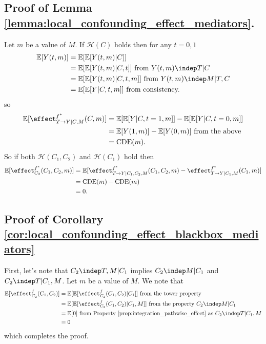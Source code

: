 \subsection{Proof of Lemma \ref{lemma:local_confounding_effect_mediators}.}
\label{proof:local_confounding_effect_mediators}
Let $m$ be a value of $M$. If $\mathcal{H}(C)$ holds then for any $t = 0, 1$
\begin{align*}
    \mathbb{E}[Y(t,m)]
    &= \mathbb{E}[\mathbb{E}[Y(t,m) | C]] \\
    &= \mathbb{E}[\mathbb{E}[Y(t,m) | C, t]] \text{ from } Y(t,m) \indep T | C \\
    &= \mathbb{E}[\mathbb{E}[Y(t,m) | C, t, m]] \text{ from } Y(t,m) \indep M | T, C \\
    &= \mathbb{E}[\mathbb{E}[Y | C, t, m]] \text{ from consistency.} \\
\end{align*}
so
\begin{align*}
    \mathbb{E}[\effect^{f^*}_{T \rightarrow Y | C, M}(C, m)]
    &= \mathbb{E}[\mathbb{E}[Y|C,t=1,m]] - \mathbb{E}[\mathbb{E}[Y|C,t=0,m]] \\
    &= \mathbb{E}[Y(1,m)] - \mathbb{E}[Y(0,m)] \text{ from the above} \\
    &= \text{CDE}(m).
\end{align*}
So if both $\mathcal{H}(C_1,C_2)$ and $\mathcal{H}(C_1)$ hold then
\begin{align*}
    \mathbb{E}[\effect^{f^*}_{C_2}(C_1,C_2,m)]
    &= \mathbb{E}[\effect^{f^*}_{T \rightarrow Y | C_1, C_2, M}(C_1, C_2, m) - \effect^{f^*}_{T \rightarrow Y | C_1, M}(C_1, m)] \\
    &= \text{CDE}(m) - \text{CDE}(m) \\
    &= 0. \\
 \end{align*}

\subsection{Proof of Corollary \ref{cor:local_confounding_effect_blackbox_mediators}}
\label{proof:local_confounding_effect_blackbox_mediators}
First, let's note that $C_2 \indep T, M | C_1$ implies $C_2 \indep M | C_1$ and $C_2 \indep T | C_1, M$. Let $m$ be a value of $M$. We note that
\begin{align*}
    \mathbb{E}[\effect^f_{C_2}(C_1,C_2)]
    &= \mathbb{E}[\mathbb{E}[\effect^f_{C_2}(C_1,C_2) | C_1]] \text{ from the tower property} \\
        &= \mathbb{E}[\mathbb{E}[\effect^f_{C_2}(C_1,C_2) | C_1, M]] \text{ from the property } C_2 \indep M | C_1 \\
    &= \mathbb{E}[0] \text{ from Property \ref{prop:integration_pathwise_effect} as } C_2 \indep T | C_1, M \\
    &= 0 \\
\end{align*}
which completes the proof.

